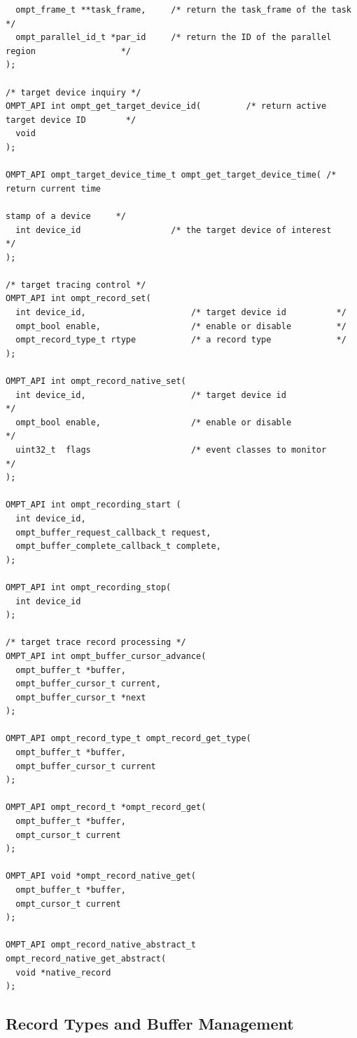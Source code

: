 \documentclass{article}
\begin{document}
{\begin{verbatim}
  ompt_frame_t **task_frame,     /* return the task_frame of the task                    */
  ompt_parallel_id_t *par_id     /* return the ID of the parallel region                 */
);

/* target device inquiry */
OMPT_API int ompt_get_target_device_id(         /* return active target device ID        */
  void
);

OMPT_API ompt_target_device_time_t ompt_get_target_device_time( /* return current time
                                                                   stamp of a device     */
  int device_id                  /* the target device of interest                        */
);

/* target tracing control */
OMPT_API int ompt_record_set(
  int device_id,                     /* target device id          */
  ompt_bool enable,                  /* enable or disable         */
  ompt_record_type_t rtype           /* a record type             */
);

OMPT_API int ompt_record_native_set(
  int device_id,                     /* target device id                */
  ompt_bool enable,                  /* enable or disable               */
  uint32_t  flags                    /* event classes to monitor        */
);

OMPT_API int ompt_recording_start (
  int device_id,
  ompt_buffer_request_callback_t request,
  ompt_buffer_complete_callback_t complete,
);

OMPT_API int ompt_recording_stop(
  int device_id
);

/* target trace record processing */
OMPT_API int ompt_buffer_cursor_advance(
  ompt_buffer_t *buffer,
  ompt_buffer_cursor_t current,
  ompt_buffer_cursor_t *next
);

OMPT_API ompt_record_type_t ompt_record_get_type(
  ompt_buffer_t *buffer,
  ompt_buffer_cursor_t current
);

OMPT_API ompt_record_t *ompt_record_get(
  ompt_buffer_t *buffer,
  ompt_cursor_t current
);
   
OMPT_API void *ompt_record_native_get(
  ompt_buffer_t *buffer,
  ompt_cursor_t current
);
  
OMPT_API ompt_record_native_abstract_t ompt_record_native_get_abstract(
  void *native_record
);
\end{verbatim}

\clearpage  
\subsection{Record Types and Buffer Management}
\label{appendix:ompt-records}

}
\end{document}
